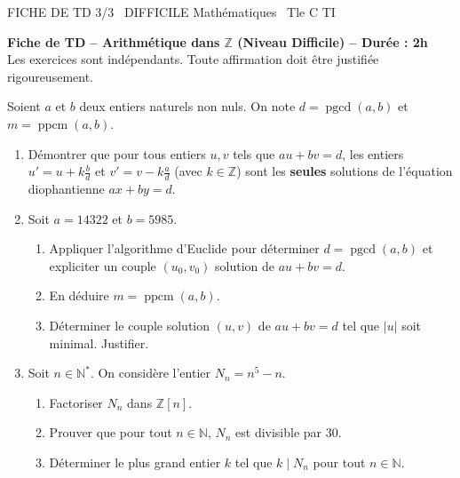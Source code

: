 \documentclass[11pt]{article}
\begin{document}
\begin{tcolorbox}[enhanced,colback=popink,colframe=popink,arc=10pt,boxrule=0pt,left=12pt,right=12pt,top=9pt,bottom=9pt]
{\color{white}\popxbold\small FICHE DE TD 3/3 \textbullet\ DIFFICILE \hfill Mathématiques \textbullet\ Tle C TI\par}
\end{tcolorbox}
\vspace{4pt}
\textbf{Fiche de TD -- Arithmétique dans $\mathbb{Z}$ (Niveau Difficile) -- Durée : 2h}\\
Les exercices sont indépendants. Toute affirmation doit être justifiée rigoureusement.

\begin{exercice}
Soient $a$ et $b$ deux entiers naturels non nuls. On note $d = \operatorname{pgcd}(a,b)$ et $m = \operatorname{ppcm}(a,b)$.
\begin{enumerate}
    \item Démontrer que pour tous entiers $u, v$ tels que $au + bv = d$, les entiers $u' = u + k\frac{b}{d}$ et $v' = v - k\frac{a}{d}$ (avec $k \in \mathbb{Z}$) sont les \textbf{seules} solutions de l'équation diophantienne $ax + by = d$.
    \item Soit $a = 14322$ et $b = 5985$.
    \begin{enumerate}
        \item Appliquer l'algorithme d'Euclide pour déterminer $d = \operatorname{pgcd}(a,b)$ et expliciter un couple $(u_0, v_0)$ solution de $au + bv = d$.
        \item En déduire $m = \operatorname{ppcm}(a,b)$.
        \item Déterminer le couple solution $(u, v)$ de $au + bv = d$ tel que $|u|$ soit minimal. Justifier.
    \end{enumerate}
    \item Soit $n \in \mathbb{N}^*$. On considère l'entier $N_n = n^5 - n$.
    \begin{enumerate}
        \item Factoriser $N_n$ dans $\mathbb{Z}[n]$.
        \item Prouver que pour tout $n \in \mathbb{N}$, $N_n$ est divisible par $30$.
        \item Déterminer le plus grand entier $k$ tel que $k \mid N_n$ pour tout $n \in \mathbb{N}$.
    \end{enumerate}
\end{enumerate}
\end{exercice}
\end{document}

